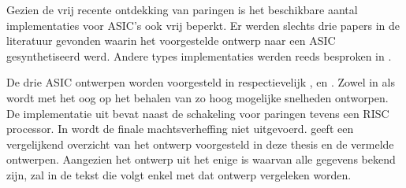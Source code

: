 Gezien de vrij recente ontdekking van paringen is het beschikbare aantal implementaties voor ASIC's ook vrij beperkt. Er werden slechts drie papers in de literatuur gevonden waarin het voorgestelde ontwerp naar een ASIC gesynthetiseerd werd. Andere types implementaties werden reeds besproken in .

De drie ASIC ontwerpen worden voorgesteld in respectievelijk \cite{beuchat-asic}, \cite{kammler} en \cite{savas}. Zowel in \cite{beuchat-asic} als \cite{savas} wordt met het oog op het behalen van zo hoog mogelijke snelheden ontworpen. De implementatie uit \cite{kammler} bevat naast de schakeling voor paringen tevens een RISC processor. In \cite{savas} wordt de finale machtsverheffing niet uitgevoerd.  geeft een vergelijkend overzicht van het ontwerp voorgesteld in deze thesis en de vermelde ontwerpen. Aangezien het ontwerp uit \cite{beuchat-asic} het enige is waarvan alle gegevens bekend zijn, zal in de tekst die volgt enkel met dat ontwerp vergeleken worden. 

